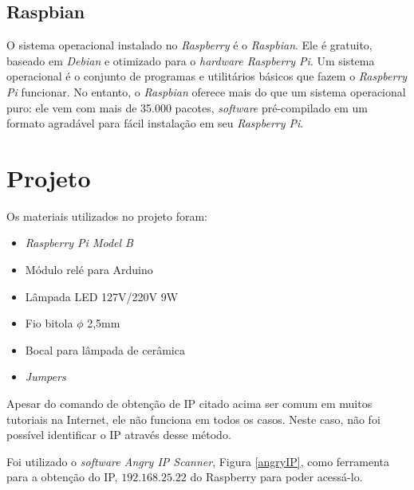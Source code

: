 \documentclass[
12pt,
openany, %
oneside, %
a4paper,			
english,			
brazil			        %
]{abntbibufjf}
\begin{document}
	\subsection{Raspbian}
	
	O sistema operacional instalado no \textit{Raspberry} é o \textit{Raspbian}. Ele é gratuito, baseado em \textit{Debian} e otimizado para o \textit{hardware Raspberry Pi}. Um sistema operacional é o conjunto de programas e utilitários básicos que fazem o \textit{Raspberry Pi} funcionar. No entanto, o \textit{Raspbian} oferece mais do que um sistema operacional puro: ele vem com mais de 35.000 pacotes, \textit{software} pré-compilado em um formato agradável para fácil instalação em seu \textit{Raspberry Pi}. \cite{RASPBIAN}

    \section{Projeto}
    
    Os materiais utilizados no projeto foram:
    
    \begin{itemize}
        \item \textit{Raspberry Pi Model B}
        \item Módulo relé para Arduino
        \item Lâmpada LED 127V/220V 9W
        \item Fio bitola $\phi$ 2,5mm
        \item Bocal para lâmpada de cerâmica
        \item \textit{Jumpers}
    \end{itemize}
    
    Apesar do comando de obtenção de IP citado acima ser comum em muitos tutoriais na Internet, ele não funciona em todos os casos. Neste caso, não foi possível identificar o IP através desse método.
	
	Foi utilizado o \textit{software Angry IP Scanner}, Figura \ref{angryIP}, como ferramenta para a obtenção do IP, $192.168.25.22$ do Raspberry para poder acessá-lo.
	
\end{document}
